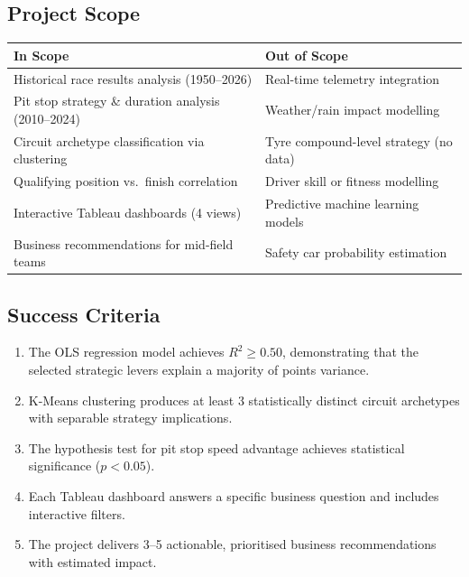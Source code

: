 \documentclass[12pt, a4paper]{article}
\begin{document}
\subsection{Project Scope}

\begin{tabularx}{\textwidth}{l X}
\toprule
\textbf{In Scope} & \textbf{Out of Scope} \\
\midrule
Historical race results analysis (1950--2026) & Real-time telemetry integration \\
Pit stop strategy \& duration analysis (2010--2024) & Weather/rain impact modelling \\
Circuit archetype classification via clustering & Tyre compound-level strategy (no data) \\
Qualifying position vs.\ finish correlation & Driver skill or fitness modelling \\
Interactive Tableau dashboards (4 views) & Predictive machine learning models \\
Business recommendations for mid-field teams & Safety car probability estimation \\
\bottomrule
\end{tabularx}

\subsection{Success Criteria}
\begin{enumerate}
    \item The OLS regression model achieves $R^2 \geq 0.50$, demonstrating that the selected strategic levers explain a majority of points variance.
    \item K-Means clustering produces at least 3 statistically distinct circuit archetypes with separable strategy implications.
    \item The hypothesis test for pit stop speed advantage achieves statistical significance ($p < 0.05$).
    \item Each Tableau dashboard answers a specific business question and includes interactive filters.
    \item The project delivers 3--5 actionable, prioritised business recommendations with estimated impact.
\end{enumerate}

\newpage

\end{document}
